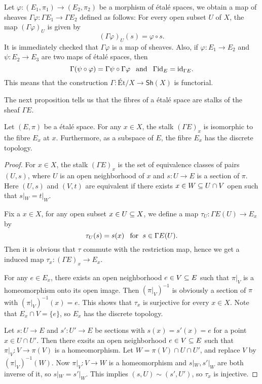 Let $\varphi:(E_1,\pi_1)\to(E_2,\pi_2)$ be a morphism of étalé spaces, we obtain a map of sheaves $\Gamma\varphi:\Gamma E_1\to\Gamma E_2$ defined as follows: For every open subset $U$ of $X$, the map $(\Gamma\varphi)_U$ is given by 
\[(\Gamma\varphi)_U(s)=\varphi\circ s.\]
It is immediately checked that $\Gamma\varphi$ is a map of sheaves. Also, if $\varphi:E_1\to E_2$ and $\psi:E_2\to E_3$ are two maps of \'etal\'e spaces, then
\[\Gamma(\psi\circ\varphi)=\Gamma\psi\circ\Gamma\varphi\hspace{8pt}\text{and}\hspace{8pt} \Gamma\mathrm{id}_E=\mathrm{id}_{\Gamma E}.\]
This means that the construction $\Gamma:\text{\'Et/}X\to\mathsf{Sh}(X)$ is functorial.

The next proposition tells us that the fibres of a \'etal\'e space are stalks of the sheaf $\Gamma E$.
\begin{proposition}\label{etale fiber stalk}
Let $(E,\pi)$ be a \'etal\'e space. For any $x\in X$, the stalk $(\Gamma E)_x$ is isomorphic to the fibre $E_x$ at $x$. Furthermore, as a subspace of $E$, the fibre $E_x$ has the discrete topology.
\end{proposition}
\begin{proof}
For $x\in X$, the stalk $(\Gamma E)_x$ is the set of equivalence classes of pairs $(U,s)$, where $U$ is an open neighborhood of $x$ and $s:U\to E$ is a section of $\pi$. Here $(U,s)$ and $(V,t)$ are equivalent if there exists $x\in W\subseteq U\cap V$ open such that $s|_{W}=t|_{W}$.\par
Fix a $x\in X$, for any open subset $x\in U\subseteq X$, we define a map $\tau_{U}:\Gamma E(U)\to E_x$ by
\[\tau_{U}(s)=s(x)\hspace{8pt}\text{for}\hspace{6pt} s\in\Gamma E(U).\]
Then it is obvious that $\tau$ commute with the restriction map, hence we get a induced map $\tau_x:(\Gamma E)_x\to E_x$.\par
For any $e\in E_x$, there exists an open neighborhood $e\in V\subseteq E$ such that $\pi|_V$ is a homeomorphism onto its open image. Then $(\pi|_V)^{-1}$ is obviously a section of $\pi$ with $(\pi|_V)^{-1}(x)=e$. This shows that $\tau_x$ is surjective for every $x\in X$. Note that $E_x\cap V=\{e\}$, so $E_x$ has the discrete topology.\par
Let $s:U\to E$ and $s':U'\to E$ be sections with $s(x)=s'(x)=e$ for a point $x\in U\cap U'$. Then there exsits an open neighborhood $e\in V\subseteq E$ such that $\pi|_V:V\to\pi(V)$ is a homeomorphism. Let $W=\pi(V)\cap U\cap U'$, and replace $V$ by $(\pi|_V)^{-1}(W)$. Now $\pi|_V:V\to W$ is a homeomorphism and $s|_W,s'|_W$ are both inverse of it, so $s|_W=s'|_W$. This implies $(s,U)\sim(s',U')$, so $\tau_x$ is injective.
\end{proof}
